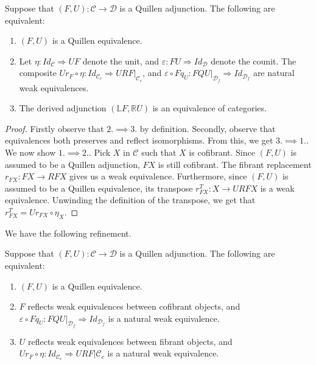 \documentclass[../thesis.tex]{subfiles}
\begin{document}
            \begin{proposition}\label{prop: Quill-Eq}
                Suppose that $(F,U):\mathcal{C}\rightarrow\mathcal{D}$ is a Quillen adjunction. The following are equivalent:
                \begin{enumerate}
                    \item $(F,U)$ is a Quillen equivalence.
                    \item Let $\eta :Id_\mathcal{C}\Rightarrow UF$ denote the unit, and $\varepsilon :FU\Rightarrow Id_\mathcal{D}$ denote the counit. The composite $Ur_{F} \circ \eta : Id_{\mathcal{C}_c} \Rightarrow URF|_{\mathcal{C}_c}$, and $\varepsilon \circ Fq_{U}:FQU|_{\mathcal{D}_f} \Rightarrow Id_{\mathcal{D}_f}$ are natural weak equivalences.
                    \item The derived adjunction $(\mathbb{L}F, \mathbb{R}U)$ is an equivalence of categories.
                \end{enumerate}
            \end{proposition}

            \begin{proof}
                Firstly observe that $2.\implies3.$ by definition. Secondly, observe that equivalences both preserves and reflect isomorphisms. From this, we get $3. \implies 1.$. We now show $1.\implies 2.$. Pick $X$ in $\mathcal{C}$ such that $X$ is cofibrant. Since $(F, U)$ is assumed to be a Quillen adjunction, $FX$ is still cofibrant. The fibrant replacement $r_{FX}: FX\rightarrow RFX$ gives us a weak equivalence. Furthermore, since $(F, U)$ is assumed to be a Quillen equivalence, its transpose $r_{FX}^T: X \rightarrow URFX$ is a weak equivalence. Unwinding the definition of the transpose, we get that $r_{FX}^T = Ur_{FX}\circ \eta_X$.

            \end{proof}

            We have the following refinement.

            \begin{corollary}\label{cor: Quill-Eq}
                Suppose that $(F,U):\mathcal{C}\rightarrow\mathcal{D}$ is a Quillen adjunction. The following are equivalent:
                \begin{enumerate}
                    \item $(F,U)$ is a Quillen equivalence.
                    \item $F$ reflects weak equivalences between cofibrant objects, and $\varepsilon \circ Fq_{U} : FQU|_{\mathcal{D}_f} \Rightarrow Id_{\mathcal{D}_f}$ is a natural weak equivalence.
                    \item $U$ reflects weak equivalences between fibrant objects, and $Ur_{F} \circ \eta : Id_{\mathcal{C}_c} \Rightarrow URF|{\mathcal{C}_c}$ is a natural weak equivalence.
                \end{enumerate}
            \end{corollary}
\end{document}
